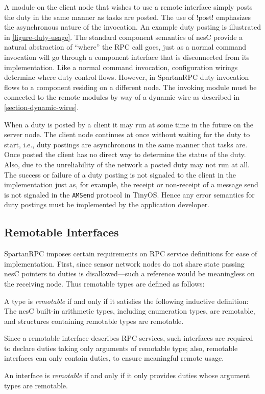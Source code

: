 A module on the client node that wishes to use a remote interface simply posts the duty in the
same manner as tasks are posted. The use of !post! emphasizes the asynchronous nature of the
invocation. An example duty posting is illustrated in \autoref{figure-duty-usage}. The standard
component semantics of nesC provide a natural abstraction of ``where'' the RPC call goes, just
as a normal command invocation will go through a component interface that is disconnected from
its implementation. Like a normal command invocation, configuration wirings determine where duty
control flows. However, in SpartanRPC duty invocation flows to a component residing on a
different node. The invoking module must be connected to the remote modules by way of a dynamic
wire as described in \autoref{section-dynamic-wires}.

When a duty is posted by a client it may run at some time in the future on the server node. The
client node continues at once without waiting for the duty to start, i.e., duty postings are
asynchronous in the same manner that tasks are. Once posted the client has no direct way to
determine the status of the duty. Also, due to the unreliability of the network a posted duty
may not run at all. The success or failure of a duty posting is not signaled to the client in
the implementation just as, for example, the receipt or non-receipt of a message send is not
signaled in the \texttt{AMSend} protocol in TinyOS. Hence any error semantics for duty postings
must be implemented by the application developer.

\subsection{Remotable Interfaces}
\label{section-remotable}

SpartanRPC imposes certain requirements on RPC service definitions for ease of implementation.
First, since sensor network nodes do not share state passing nesC pointers to duties is
disallowed---such a reference would be meaningless on the receiving node. Thus remotable types
are defined as follows:
\begin{definition}
  A type is \emph{remotable} if and only if it satisfies the following inductive definition: The
  nesC built-in arithmetic types, including enumeration types, are remotable, and structures
  containing remotable types are remotable.
\end{definition}
Since a remotable interface describes RPC services, such interfaces are required to declare
duties taking only arguments of remotable type; also, remotable interfaces can only contain
duties, to ensure meaningful remote usage.
\begin{definition}
  An interface is \emph{remotable} if and only if it only provides duties whose argument types
  are remotable.
\end{definition}


